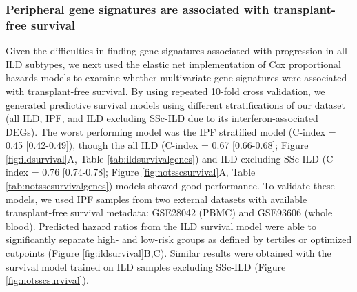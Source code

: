 \documentclass[
]{article}
\begin{document}
\subsubsection{Peripheral gene signatures are associated with transplant-free survival}\label{peripheral-gene-signatures-are-associated-with-transplant-free-survival}

Given the difficulties in finding gene signatures associated with progression in all ILD subtypes, we next used the elastic net implementation of Cox proportional hazards models to examine whether multivariate gene signatures were associated with transplant-free survival. By using repeated 10-fold cross validation, we generated predictive survival models using different stratifications of our dataset (all ILD, IPF, and ILD excluding SSc-ILD due to its interferon-associated DEGs). The worst performing model was the IPF stratified model (C-index = 0.45 {[}0.42-0.49{]}), though the all ILD (C-index = 0.67 {[}0.66-0.68{]}; Figure \ref{fig:ildsurvival}A, Table \ref{tab:ildsurvivalgenes}) and ILD excluding SSc-ILD (C-index = 0.76 {[}0.74-0.78{]}; Figure \ref{fig:notsscsurvival}A, Table \ref{tab:notsscsurvivalgenes}) models showed good performance. To validate these models, we used IPF samples from two external datasets with available transplant-free survival metadata: GSE28042 (PBMC) and GSE93606 (whole blood). Predicted hazard ratios from the ILD survival model were able to significantly separate high- and low-risk groups as defined by tertiles or optimized cutpoints (Figure \ref{fig:ildsurvival}B,C). Similar results were obtained with the survival model trained on ILD samples excluding SSc-ILD (Figure \ref{fig:notsscsurvival}).
\end{document}
